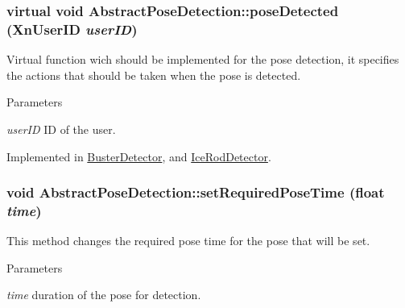 \hypertarget{classAbstractPoseDetection_a7351e9ac500669934ff823aaf0767076}{
\subsubsection[{poseDetected}]{\setlength{\rightskip}{0pt plus 5cm}virtual void AbstractPoseDetection::poseDetected (XnUserID {\em userID})}}
\label{classAbstractPoseDetection_a7351e9ac500669934ff823aaf0767076}
Virtual function wich should be implemented for the pose detection, it specifies the actions that should be taken when the pose is detected. 
\begin{DoxyParams}{Parameters}
\item[{\em userID}]ID of the user. \end{DoxyParams}


Implemented in \hyperlink{classBusterDetector_ac91be6357453deb9e15b3297b6299be3}{BusterDetector}, and \hyperlink{classIceRodDetector_aa2ef806316f44c93ea43f0b937c082fc}{IceRodDetector}.

\hypertarget{classAbstractPoseDetection_a6331815704045d8370972f5770bd8d5f}{
\subsubsection[{setRequiredPoseTime}]{\setlength{\rightskip}{0pt plus 5cm}void AbstractPoseDetection::setRequiredPoseTime (float {\em time})}}
\label{classAbstractPoseDetection_a6331815704045d8370972f5770bd8d5f}
This method changes the required pose time for the pose that will be set. 
\begin{DoxyParams}{Parameters}
\item[{\em time}]duration of the pose for detection. \end{DoxyParams}


